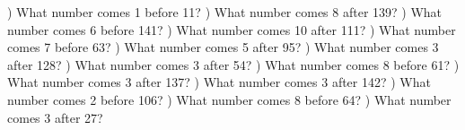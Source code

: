 \documentclass{article}%
\begin{document}
\newline%
\newline%
) What number comes 1 before 11?%
\newline%
\newline%
) What number comes 8 after 139?%
\newline%
\newline%
) What number comes 6 before 141?%
\newline%
\newline%
) What number comes 10 after 111?%
\newline%
\newline%
) What number comes 7 before 63?%
\newline%
\newline%
) What number comes 5 after 95?%
\newline%
\newline%
) What number comes 3 after 128?%
\newline%
\newline%
) What number comes 3 after 54?%
\newline%
\newline%
) What number comes 8 before 61?%
\newline%
\newline%
) What number comes 3 after 137?%
\newline%
\newline%
) What number comes 3 after 142?%
\newline%
\newline%
) What number comes 2 before 106?%
\newline%
\newline%
) What number comes 8 before 64?%
\newline%
\newline%
) What number comes 3 after 27?%
\end{document}
